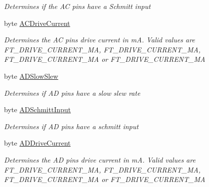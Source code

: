 \begin{DoxyCompactItemize}
\begin{DoxyCompactList}\small\item\em Determines if the AC pins have a Schmitt input \end{DoxyCompactList}\item 
byte \mbox{\hyperlink{class_f_t_d2_x_x___n_e_t_1_1_f_t_d_i_1_1_f_t___x_s_e_r_i_e_s___e_e_p_r_o_m___s_t_r_u_c_t_u_r_e_af5e39d27437f2513c73072610206f59f}{A\+C\+Drive\+Current}}
\begin{DoxyCompactList}\small\item\em Determines the AC pins drive current in mA. Valid values are F\+T\+\_\+\+D\+R\+I\+V\+E\+\_\+\+C\+U\+R\+R\+E\+N\+T\+\_\+MA, F\+T\+\_\+\+D\+R\+I\+V\+E\+\_\+\+C\+U\+R\+R\+E\+N\+T\+\_\+MA, F\+T\+\_\+\+D\+R\+I\+V\+E\+\_\+\+C\+U\+R\+R\+E\+N\+T\+\_\+MA or F\+T\+\_\+\+D\+R\+I\+V\+E\+\_\+\+C\+U\+R\+R\+E\+N\+T\+\_\+MA \end{DoxyCompactList}\item 
byte \mbox{\hyperlink{class_f_t_d2_x_x___n_e_t_1_1_f_t_d_i_1_1_f_t___x_s_e_r_i_e_s___e_e_p_r_o_m___s_t_r_u_c_t_u_r_e_af2b953826b0c8cba5261983d35a97fb4}{A\+D\+Slow\+Slew}}
\begin{DoxyCompactList}\small\item\em Determines if AD pins have a slow slew rate \end{DoxyCompactList}\item 
byte \mbox{\hyperlink{class_f_t_d2_x_x___n_e_t_1_1_f_t_d_i_1_1_f_t___x_s_e_r_i_e_s___e_e_p_r_o_m___s_t_r_u_c_t_u_r_e_a6dc84d671a56bfc0931c9c935303a858}{A\+D\+Schmitt\+Input}}
\begin{DoxyCompactList}\small\item\em Determines if AD pins have a schmitt input \end{DoxyCompactList}\item 
byte \mbox{\hyperlink{class_f_t_d2_x_x___n_e_t_1_1_f_t_d_i_1_1_f_t___x_s_e_r_i_e_s___e_e_p_r_o_m___s_t_r_u_c_t_u_r_e_ad97b9160e86f7b6f05e44f5242eaf94f}{A\+D\+Drive\+Current}}
\begin{DoxyCompactList}\small\item\em Determines the AD pins drive current in mA. Valid values are F\+T\+\_\+\+D\+R\+I\+V\+E\+\_\+\+C\+U\+R\+R\+E\+N\+T\+\_\+MA, F\+T\+\_\+\+D\+R\+I\+V\+E\+\_\+\+C\+U\+R\+R\+E\+N\+T\+\_\+MA, F\+T\+\_\+\+D\+R\+I\+V\+E\+\_\+\+C\+U\+R\+R\+E\+N\+T\+\_\+MA or F\+T\+\_\+\+D\+R\+I\+V\+E\+\_\+\+C\+U\+R\+R\+E\+N\+T\+\_\+MA \end{DoxyCompactList}\item 

\end{DoxyCompactItemize}
